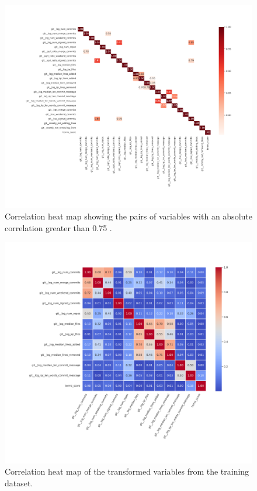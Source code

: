 \documentclass[a4paper, 12pt]{book}
\begin{document}
\begin{figure}
 \centering
  \includegraphics[width=18cm, keepaspectratio]{img/eda_corr_heatmap_more_75.png}
  \caption{Correlation heat map showing the pairs of variables with an absolute correlation greater than 0.75 .}
  \label{fig:corr-heatmap-greater-075}
\end{figure}


\begin{figure}
 \centering
  \includegraphics[width=18cm, keepaspectratio]{img/eda_corr_heatmap_correlation_fixed.png}
  \caption{Correlation heat map of the transformed variables from the training dataset.}
  \label{fig:corr-heatmap-after}
\end{figure}
\end{document}
